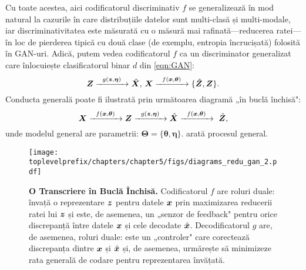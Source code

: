 \documentclass[../../book-main_ro.tex]{subfiles}
\begin{document}
Cu toate acestea, aici codificatorul discriminativ $f$ se generalizează în mod natural la cazurile în care distribuțiile datelor sunt multi-clasă și multi-modale, iar discriminativitatea este măsurată cu o măsură mai rafinată---reducerea ratei---în loc de pierderea tipică cu două clase (de exemplu, entropia încrucișată) folosită în GAN-uri. Adică, putem vedea codificatorul $f$ ca un discriminator generalizat care înlocuiește clasificatorul binar $d$ din \eqref{eqn:GAN}:
\begin{equation}
 \bm{Z} \xrightarrow{\hspace{2mm} g(\bm{z},\bm \eta) \hspace{2mm}} \hat {\bm{X}}, \, \bm{X} \xrightarrow{\hspace{2mm} f(\bm{x}, \bm \theta)\hspace{2mm}} \{\hat {\bm{Z}}, \bm{Z}\}.
 \label{eqn:closed-loop-GAN}
\end{equation}
Conducta generală poate fi ilustrată prin următoarea diagramă „în buclă închisă":
\begin{equation}
    \bm{X} \xrightarrow{\hspace{2mm} f(\bm{x}, \bm \theta)\hspace{2mm}} \bm{Z} \xrightarrow{\hspace{2mm} g(\bm{z},\bm \eta) \hspace{2mm}} \hat {\bm{X}} \xrightarrow{\hspace{2mm} f(\bm{x}, \bm \theta)\hspace{2mm}} \ \hat {\bm{Z}},
\end{equation}
unde modelul general are parametrii: $\bm \Theta = \{\bm \theta, \bm \eta\}$.  arată procesul general.

\begin{figure}[t]
{\texttt{[image: \\toplevelprefix/chapters/chapter5/figs/diagrams\_redu\_gan\_2.pdf]}}
\caption{{\bf %
 O Transcriere în Buclă Închisă.} Codificatorul $f$ are roluri duale: învață o reprezentare $\bm{z}$ pentru datele $\bm{x}$ prin maximizarea reducerii ratei lui $\bm{z}$ și este, de asemenea, un „senzor de feedback" pentru orice discrepanță între datele $\bm{x}$ și cele decodate $\hat {\bm{x}}$. Decodificatorul $g$ are, de asemenea, roluri duale: este un „controler" care corectează discrepanța dintre $\bm{x}$ și $\hat {\bm{x}}$ și, de asemenea, urmărește să minimizeze rata generală de codare pentru reprezentarea învățată.} \label{fig:auto-encoding-closed}
\end{figure}
\end{document}
